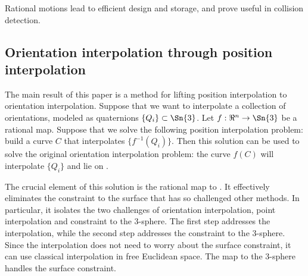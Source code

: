 \documentclass[12pt]{article}
\begin{document}
Rational motions lead to efficient design and storage, and
prove useful in collision detection.

\subsection{Orientation interpolation through position interpolation}
\label{sec:oritopos}

The main result of this paper is a method for lifting position 
interpolation to orientation interpolation.
Suppose that we want to interpolate a collection of orientations, 
modeled as quaternions $\{Q_i\} \subset \Sn{3}$.
Let $f: \Re^n \rightarrow \Sn{3}$ be a rational map.
Suppose that we solve the following position interpolation problem:
build a curve $C$ that interpolates $\{f^{-1}(Q_i)\}$.
Then this solution can be used to solve the original orientation interpolation problem:
the curve $f(C)$ will interpolate $\{Q_i\}$ and lie on .

The crucial element of this solution is the rational map to .
It effectively eliminates the constraint to the surface  that has 
so challenged other methods.
In particular, it isolates the two challenges
of orientation interpolation, point interpolation and constraint to the 3-sphere.
The first step addresses the interpolation, while the second step addresses the constraint
to the 3-sphere.
Since the interpolation does not need to worry about the surface constraint, it can use
classical interpolation in free Euclidean space.
The map to the 3-sphere handles the surface constraint.
\end{document}
